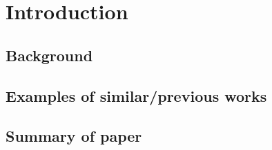 % 
\chapter{Introduction}\label{ch:introduction}
\section{Background}\label{sec:background}
\lipsum[1]

\section{Examples of similar/previous works}
\lipsum[1]

\section{Summary of paper}
\lipsum[1]


